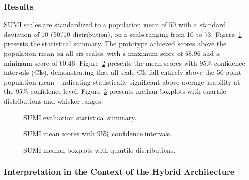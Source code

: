 \subsubsection{Results}

SUMI scales are standardized to a population mean of 50 with a standard deviation of 10 (50/10 distribution), on a scale ranging from 10 to 73. Figure~\ref{fig:sumi_summary} presents the statistical summary. The prototype achieved scores above the population mean on all six scales, with a maximum score of 68.96 and a minimum score of 60.46. Figure~\ref{fig:sumi_ci} presents the mean scores with 95\% confidence intervals (CIs), demonstrating that all scale CIs fall entirely above the 50-point population mean---indicating statistically significant above-average usability at the 95\% confidence level. Figure~\ref{fig:sumi_box} presents median boxplots with quartile distributions and whisker ranges.

\begin{figure}[!ht]
\centering
{}
\caption{SUMI evaluation statistical summary.}\label{fig:sumi_summary}
\end{figure}

\begin{figure}[!ht]
\centering
{}
\caption{SUMI mean scores with 95\% confidence intervals.}\label{fig:sumi_ci}
\end{figure}

\begin{figure}[!ht]
\centering
{}
\caption{SUMI median boxplots with quartile distributions.}\label{fig:sumi_box}
\end{figure}

\subsubsection{Interpretation in the Context of the Hybrid Architecture}

